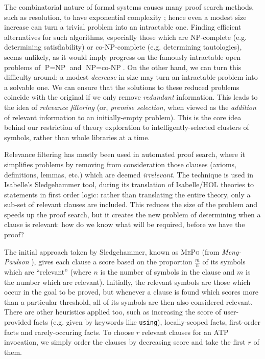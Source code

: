 The combinatorial nature of formal systems causes many proof search methods, such as resolution, to have exponential complexity \citep{haken1985intractability}; hence even a modest size increase can turn a trivial problem into an intractable one. Finding efficient alternatives for such algorithms, especially those which are NP-complete (e.g. determining satisfiability) or co-NP-complete (e.g. determining tautologies), seems unlikely, as it would imply progress on the famously intractable open problems of $\text{P} = \text{NP}$ and $\text{NP} = \text{co-NP}$. On the other hand, we can turn this difficulty around: a modest \emph{decrease} in size may turn an intractable problem into a solvable one. We can ensure that the solutions to these reduced problems coincide with the original if we only remove \emph{redundant} information. This leads to the idea of \emph{relevance filtering} (or, \emph{premise selection}, when viewed as the \emph{addition} of relevant information to an initially-empty problem). This is the core idea behind our restriction of theory exploration to intelligently-selected clusters of symbols, rather than whole libraries at a time.

Relevance filtering has mostly been used in automated proof search, where it simplifies problems by removing from consideration those clauses (axioms, definitions, lemmas, etc.) which are deemed \emph{irrelevant}. The technique is used in Isabelle's Sledgehammer tool, during its translation of Isabelle/HOL theories to statements in first order logic: rather than translating the entire theory, only a sub-set of relevant clauses are included. This reduces the size of the problem and speeds up the proof search, but it creates the new problem of determining when a clause is relevant: how do we know what will be required, before we have the proof?

The initial approach taken by Sledgehammer, known as \textsc{MePo} (from \emph{Meng-Paulson} \citep{meng2009lightweight}), gives each clause a score based on the proportion $\frac{m}{n}$ of its symbols which are ``relevant'' (where $n$ is the number of symbols in the clause and $m$ is the number which are relevant). Initially, the relevant symbols are those which occur in the goal to be proved, but whenever a clause is found which scores more than a particular threshold, all of its symbols are then also considered relevant. There are other heuristics applied too, such as increasing the score of user-provided facts (e.g. given by keywords like \texttt{using}), locally-scoped facts, first-order facts and rarely-occuring facts. To choose $r$ relevant clauses for an ATP invocation, we simply order the clauses by decreasing score and take the first $r$ of them.

